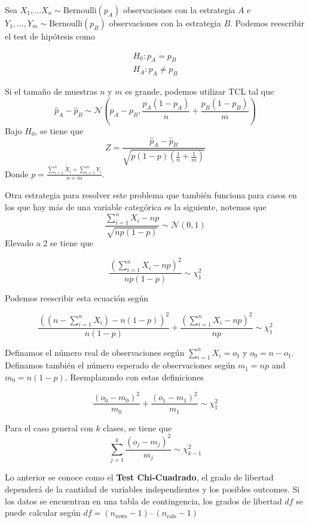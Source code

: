Sea $X_1 , \dots X_n \sim \text{Bernoulli}(p_A)$ observaciones con la estrategia $A$ e $Y_1, \dots, Y_m \sim \text{Bernoulli}(p_B)$ observaciones con la estrategia $B$. Podemos reescribir el test de hipótesis como 

\begin{equation*}
\begin{aligned}
    H_0: p_A = p_B \\ 
    H_A: p_A \neq p_B
\end{aligned}
\end{equation*}

Si el tamaño de muestras $n$ y $m$ es grande, podemos utilizar TCL tal que 
$$
\hat{p}_A - \hat{p}_B \sim \mathcal{N} \left ( p_A - p_B , \frac{p_A(1-p_A)}{n} + \frac{p_B(1-p_B)}{m} \right )
$$
Bajo $H_0$, se tiene que 
$$
Z = \frac{\hat{p}_A - \hat{p}_B}{\sqrt{p(1-p)\left ( \frac{1}{n} + \frac{1}{m} \right )}}
$$
Donde $p = \frac{\sum_{i=1}^n X_i + \sum_{i=1}^m Y_i}{n + m}$.

Otra estrategia para resolver este problema que también funciona para casos en los que hay más de una variable categórica es la siguiente, notemos que 
$$
\frac{\sum_{i=1}^{n}X_i - np}{\sqrt{np(1-p)}} \sim \mathcal{N}(0, 1)
$$
Elevado a 2 se tiene que 

$$ \frac{(\sum_{i=1}^{n}X_i - np)^2}{np(1-p)} \sim \chi^2_{1}$$

Podemos reescribir esta ecuación según 

$$ \frac{((n-\sum_{i=1}^n X_i) - n(1-p))^2}{n(1-p)} + \frac{(\sum_{i=1}^n X_i - np)^2}{np} \sim \chi^2_{1}$$

Definamos el número real de observaciones según $\sum_{i=1}^n X_i = o_1$ y $o_0 = n - o_1$. Definamos también el número esperado de observaciones según $m_1 = np$ and $m_0 = n(1-p)$. Reemplazando con estas definiciones

$$ \frac{(o_0 - m_0)^2}{m_0} + \frac{(o_1 - m_1)^2}{m_1} \sim \chi^2_{1} $$ 

Para el caso general con $k$ clases, se tiene que 
$$ \sum_{j=1}^{k}\frac{(o_j - m_j)^2}{m_j} \sim \chi^2_{k-1}$$ 

Lo anterior se conoce como el \textbf{Test Chi-Cuadrado}, el grado de libertad dependerá de la cantidad de variables independientes y los posibles outcomes. Si los datos se encuentran en una tabla de contingencia, los grados de libertad $df$ se puede calcular según $df = (n_{\text{rows}} - 1)\cdot (n_{\text{cols}} - 1)$





